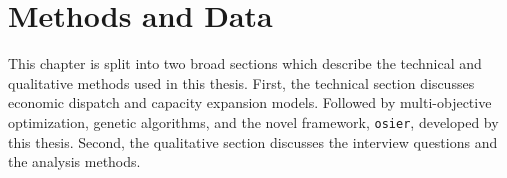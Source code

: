 \chapter{Methods and Data}

This chapter is split into two broad sections which describe the technical
and qualitative methods used in this thesis. First, the technical section
discusses economic dispatch and capacity expansion models. Followed by 
multi-objective optimization, genetic algorithms, and the novel framework, 
\texttt{osier}, developed by this thesis. Second, the qualitative section 
discusses the interview questions and the analysis methods.




